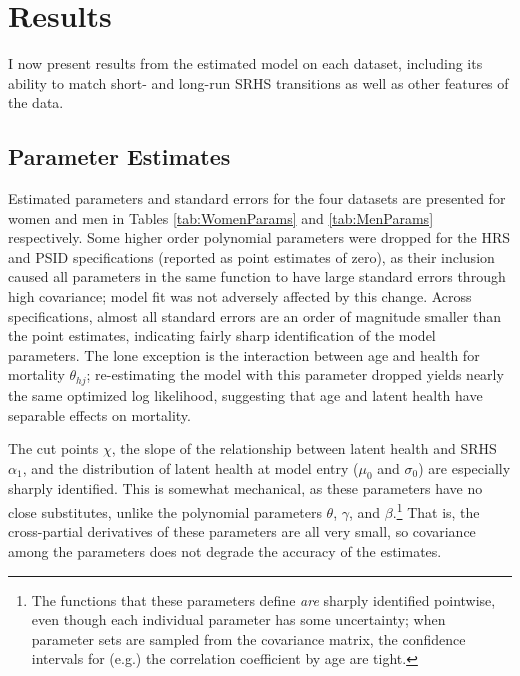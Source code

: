\documentclass[12pt,pdftex,letterpaper]{article}
\newcommand{\Health}{h}
\newcommand{\Age}{j}
\newcommand{\HealthInitMean}{\mu_0}
\newcommand{\HealthInitStd}{\sigma_0}
\newcommand{\Cut}{\chi}
\newcommand{\MortParam}{\theta}
\newcommand{\CorrParam}{\gamma}
\newcommand{\HealthParam}{\beta}
\newcommand{\LatentParam}{\alpha}
\begin{document}
\section{Results}\label{sec:Results}

I now present results from the estimated model on each dataset, including its ability to match short- and long-run SRHS transitions as well as other features of the data.

\subsection{Parameter Estimates}

Estimated parameters and standard errors for the four datasets are presented for women and men in Tables \ref{tab:WomenParams} and \ref{tab:MenParams} respectively.  Some higher order polynomial parameters were dropped for the HRS and PSID specifications (reported as point estimates of zero), as their inclusion caused all parameters in the same function to have large standard errors through high covariance; model fit was not adversely affected by this change.  Across specifications, almost all standard errors are an order of magnitude smaller than the point estimates, indicating fairly sharp identification of the model parameters.  The lone exception is the interaction between age and health for mortality $\MortParam_{\Health \Age}$; re-estimating the model with this parameter dropped yields nearly the same optimized log likelihood, suggesting that age and latent health have separable effects on mortality.

The cut points $\Cut$, the slope of the relationship between latent health and SRHS $\LatentParam_1$, and the distribution of latent health at model entry ($\HealthInitMean$ and $\HealthInitStd$) are especially sharply identified.  This is somewhat mechanical, as these parameters have no close substitutes, unlike the polynomial parameters $\MortParam$, $\CorrParam$, and $\HealthParam$.\footnote{The functions that these parameters define \textit{are} sharply identified pointwise, even though each individual parameter has some uncertainty; when parameter sets are sampled from the covariance matrix, the confidence intervals for (e.g.) the correlation coefficient by age are tight.}  That is, the cross-partial derivatives of these parameters are all very small, so covariance among the parameters does not degrade the accuracy of the estimates.
\end{document}
